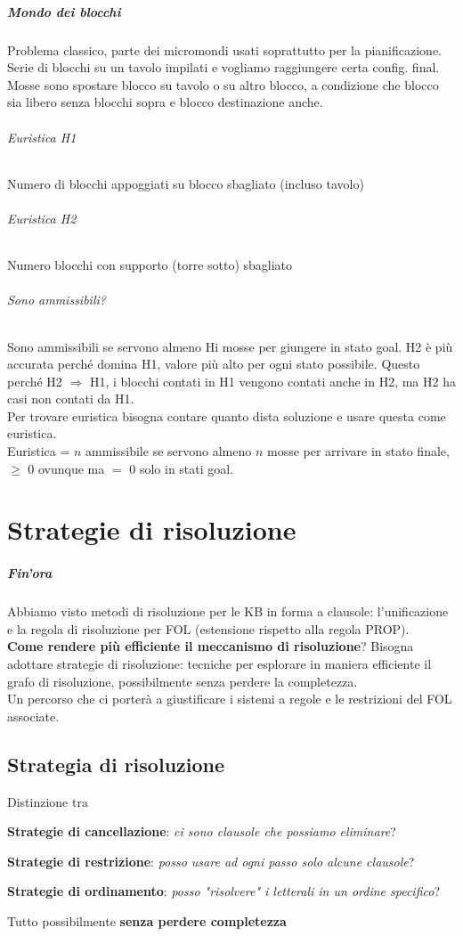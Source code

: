 \documentclass[10pt]{book}
\begin{document}
\paragraph{Mondo dei blocchi} Problema classico, parte dei micromondi usati soprattutto per la pianificazione. Serie di blocchi su un tavolo impilati e vogliamo raggiungere certa config. final. Mosse sono spostare blocco su tavolo o su altro blocco, a condizione che blocco sia libero senza blocchi sopra e blocco destinazione anche.
\subparagraph{Euristica H1} Numero di blocchi appoggiati su blocco sbagliato (incluso tavolo)
\subparagraph{Euristica H2} Numero blocchi con supporto (torre sotto) sbagliato
\subparagraph{Sono ammissibili?} Sono ammissibili se servono almeno Hi mosse per giungere in stato goal. H2 è più accurata perché domina H1, valore più alto per ogni stato possibile. Questo perché H2 $\Rightarrow$ H1, i blocchi contati in H1 vengono contati anche in H2, ma H2 ha casi non contati da H1.\\
Per trovare euristica bisogna contare quanto dista soluzione e usare questa come euristica.\\
Euristica = $n$ ammissibile se servono almeno $n$ mosse per arrivare in stato finale, $\geq$ 0 ovunque ma $=$ 0 solo in stati goal.

\chapter{Strategie di risoluzione}
\paragraph{Fin'ora} Abbiamo visto metodi di risoluzione per le KB in forma a clausole: l'unificazione e la regola di risoluzione per FOL (estensione rispetto alla regola PROP).\\
\textbf{Come rendere più efficiente il meccanismo di risoluzione}? Bisogna adottare strategie di risoluzione: tecniche per esplorare in maniera efficiente il grafo di risoluzione, possibilmente senza perdere la completezza.\\
Un percorso che ci porterà a giustificare i sistemi a regole e le restrizioni del FOL associate.
\section{Strategia di risoluzione}
Distinzione tra 
	\begin{list}{}{}
		\item \textbf{Strategie di cancellazione}: \textit{ci sono clausole che possiamo eliminare}?
		\item \textbf{Strategie di restrizione}: \textit{posso usare ad ogni passo solo alcune clausole}?
		\item \textbf{Strategie di ordinamento}: \textit{posso "risolvere" i letterali in un ordine specifico}?
	\end{list}
Tutto possibilmente \textbf{senza perdere completezza}
\end{document}
